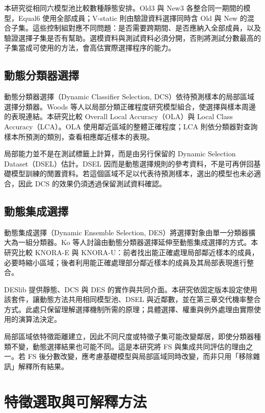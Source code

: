 本研究從相同六模型池比較數種靜態安排。Old3 與 New3 各整合同一期間的模型，Equal6 使用全部成員；V-static 則由驗證資料選擇同時含 Old 與 New 的混合子集。這些控制組對應不同問題：是否需要跨期間、是否應納入全部成員，以及驗證選擇子集是否有幫助。選模資料與測試資料必須分開，否則將測試分數最高的子集當成可使用的方法，會高估實際選擇程序的能力。

\subsection{動態分類器選擇}

動態分類器選擇（Dynamic Classifier Selection, DCS）依待預測樣本的局部區域選擇分類器。Woods 等人\autocite{woods1997local}以局部分類正確程度研究模型組合，使選擇與樣本周邊的表現連結。本研究比較 Overall Local Accuracy（OLA）與 Local Class Accuracy（LCA）。OLA 使用鄰近區域的整體正確程度；LCA 則依分類器對查詢樣本所預測的類別，查看相應鄰近樣本的表現\autocite{deslib-ola-docs,deslib-lca-docs}。

局部能力並不是在測試標籤上計算，而是由另行保留的 Dynamic Selection Dataset（DSEL）估計。DSEL 因而是動態選擇規則的參考資料，不是可再併回基礎模型訓練的閒置資料。若這個區域不足以代表待預測樣本，選出的模型也未必適合，因此 DCS 的效果仍須透過保留測試資料確認。

\subsection{動態集成選擇}

動態集成選擇（Dynamic Ensemble Selection, DES）將選擇對象由單一分類器擴大為一組分類器。Ko 等人\autocite{ko2008dynamic}討論由動態分類器選擇延伸至動態集成選擇的方式。本研究比較 KNORA-E 與 KNORA-U：前者找出能正確處理局部鄰近樣本的成員，必要時縮小區域；後者利用能正確處理部分鄰近樣本的成員及其局部表現進行整合\autocite{deslib-knorae-docs,deslib-knorau-docs}。

DESlib 提供靜態、DCS 與 DES 的實作與共同介面\autocite{cruz2020deslib}。本研究依固定版本設定使用該套件，讓動態方法共用相同模型池、DSEL 與近鄰數，並在第三章交代機率整合方式。此處只保留理解選擇機制所需的原理；具體選擇、權重與例外處理由實際使用的演算法決定。

局部區域依特徵距離建立，因此不同尺度或特徵子集可能改變鄰居，即使分類器種類不變，動態選擇結果也可能不同。這是本研究將 FS 與集成共同評估的理由之一。若 FS 後分數改變，應考慮基礎模型與局部區域同時改變，而非只用「移除雜訊」解釋所有結果。

\section{特徵選取與可解釋方法}


